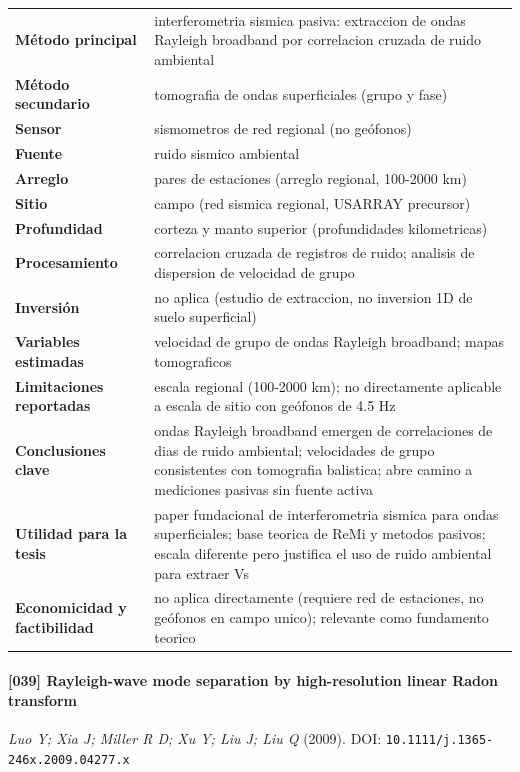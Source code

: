 \begin{center}\scriptsize
\begin{tabularx}{\textwidth}{@{}>{\bfseries}p{3.3cm} X@{}}
\toprule
M\'etodo principal & interferometria sismica pasiva: extraccion de ondas Rayleigh broadband por correlacion cruzada de ruido ambiental \\
M\'etodo secundario & tomografia de ondas superficiales (grupo y fase) \\
Sensor & sismometros de red regional (no geófonos) \\
Fuente & ruido sismico ambiental \\
Arreglo & pares de estaciones (arreglo regional, 100-2000 km) \\
Sitio & campo (red sismica regional, USARRAY precursor) \\
Profundidad & corteza y manto superior (profundidades kilometricas) \\
Procesamiento & correlacion cruzada de registros de ruido; analisis de dispersion de velocidad de grupo \\
Inversi\'on & no aplica (estudio de extraccion, no inversion 1D de suelo superficial) \\
Variables estimadas & velocidad de grupo de ondas Rayleigh broadband; mapas tomograficos \\
Limitaciones reportadas & escala regional (100-2000 km); no directamente aplicable a escala de sitio con geófonos de 4.5 Hz \\
Conclusiones clave & ondas Rayleigh broadband emergen de correlaciones de dias de ruido ambiental; velocidades de grupo consistentes con tomografia balistica; abre camino a mediciones pasivas sin fuente activa \\
Utilidad para la tesis & paper fundacional de interferometria sismica para ondas superficiales; base teorica de ReMi y metodos pasivos; escala diferente pero justifica el uso de ruido ambiental para extraer Vs \\
Economicidad y factibilidad & no aplica directamente (requiere red de estaciones, no geófonos en campo unico); relevante como fundamento teorico \\
\bottomrule
\end{tabularx}
\end{center}

\paragraph{[039] Rayleigh-wave mode separation by high-resolution linear Radon transform} \emph{Luo Y; Xia J; Miller R D; Xu Y; Liu J; Liu Q} (2009).
{\scriptsize DOI: \texttt{10.1111/j.1365-246x.2009.04277.x}}

